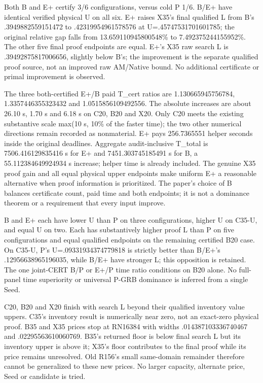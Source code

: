 \documentclass[
  american,
  11pt,
]{article}
\begin{document}
Both B and E+ certify 3/6 configurations, versus cold P 1/6. B/E+ have
identical verified physical U on all six. E+ raises X35's final
qualified L from B's .3949882559151472 to .42319954961578576 at
U=.45747531701601785; the original relative gap falls from
13.659110945800548\% to 7.492375244155952\%. The other five final proof
endpoints are equal. E+'s X35 raw search L is .39492875817006656,
slightly below B's; the improvement is the separate qualified proof
source, not an improved raw AM/Native bound. No additional certificate
or primal improvement is observed.

The three both-certified E+/B paid T\_\allowbreak{}cert ratios are 1.130665945756784,
1.3357446355323432 and 1.0515856109492556. The absolute increases are
about 26.10 s, 1.70 s and 6.18 s on C20, B20 and X20. Only C20 meets the
existing substantive scale max(10 s, 10\% of the faster time); the two
other numerical directions remain recorded as nonmaterial. E+ pays
256.7365551 helper seconds inside the original deadlines. Aggregate
audit-inclusive T\_\allowbreak{}total is 7506.416129835416 s for E+ and
7451.303745185491 s for B, a 55.112384649924934 s increase; helper time
is already included. The genuine X35 proof gain and all equal physical
upper endpoints make uniform E+ a reasonable alternative when proof
information is prioritized. The paper's choice of B balances certificate
count, paid time and both endpoints; it is not a dominance theorem or a
requirement that every input improve.

B and E+ each have lower U than P on three configurations, higher U on
C35-U, and equal U on two. Each has substantively higher proof L than P
on five configurations and equal qualified endpoints on the remaining
certified B20 case. On C35-U, P's U=.09331934374779818 is strictly
better than B/E+'s .12956638965196035, while B/E+ have stronger L; this
opposition is retained. The one joint-CERT B/P or E+/P time ratio
conditions on B20 alone. No full-panel time superiority or universal
P-GRB dominance is inferred from a single Seed.

C20, B20 and X20 finish with search L beyond their qualified inventory
value uppers. C35's inventory result is numerically near zero, not an
exact-zero physical proof. B35 and X35 prices stop at RN16384 with
widths .014387103336740467 and .02295563610060769. B35's returned floor
is below final search L but its inventory upper is above it; X35's floor
contributes to the final proof while its price remains unresolved. Old
R156's small same-domain remainder therefore cannot be generalized to
these new prices. No larger capacity, alternate price, Seed or candidate
is tried.
\end{document}
